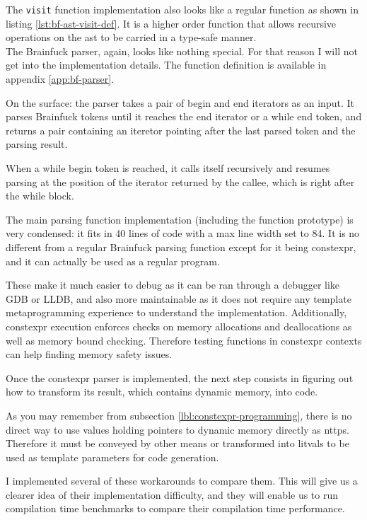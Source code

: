 \documentclass[../main]{subfiles}
\begin{document}
The \lstinline{visit} function implementation also looks like a regular \cpp
function as shown in listing \ref{lst:bf-ast-visit-def}.
It is a higher order function that allows recursive operations on the \gls{ast}
to be carried in a type-safe manner.
\\

The Brainfuck parser, again, looks like nothing special. For that reason I will
not get into the implementation details. The function definition is available
in appendix \ref{app:bf-parser}.

On the surface: the parser takes a pair of begin and end iterators as an input.
It parses Brainfuck tokens until it reaches the end iterator or a while end
token, and returns a pair containing an iteretor pointing after the last parsed
token and the parsing result.

When a while begin token is reached, it calls itself recursively and resumes
parsing at the position of the iterator returned by the callee, which is right
after the while block.

The main parsing function implementation (including the function prototype)
is very condensed: it fits in 40 lines of code with a max line width set to 84.
It is no different from a regular Brainfuck parsing function except for it being
\gls{constexpr}, and it can actually be used as a regular \cpp program.

These make it much easier to debug as it can be ran through a \cpp debugger like
GDB or LLDB, and also more maintainable as it does not require any
template metaprogramming experience to understand the implementation.
Additionally, \gls{constexpr} execution enforces checks on memory allocations and
deallocations as well as memory bound checking. Therefore testing functions
in \gls{constexpr} contexts can help finding memory safety issues.

Once the \gls{constexpr} parser is implemented, the next step consists in
figuring out how to transform its result, which contains dynamic memory,
into \cpp code.

As you may remember from subsection \ref{lbl:constexpr-programming},
there is no direct way to use values holding pointers to dynamic memory
directly as \glspl{nttp}.
Therefore it must be conveyed by other means or transformed into \glspl{litval}
to be used as template parameters for \cpp code generation.

I implemented several of these workarounds to compare them.
This will give us a clearer idea of their implementation difficulty,
and they will enable us to run compilation time benchmarks to compare their
compilation time performance.
\end{document}
